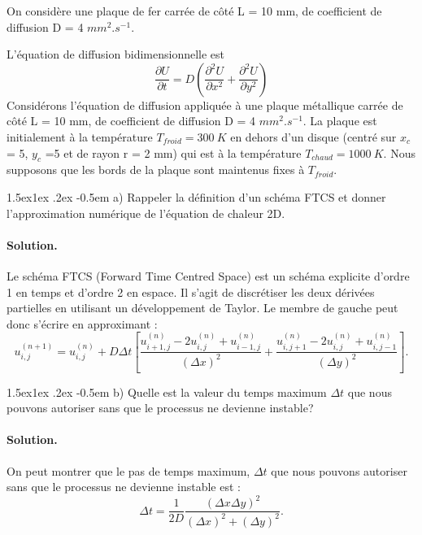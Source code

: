 \documentclass[%
oneside,                 %
final,                   %
10pt,french]{article}
\makeatletter
\newenvironment{doconceexercise}{}{}
\newcounter{doconceexercisecounter}
\newcommand\subex{\@startsection{paragraph}{4}{\z@}%
                  {1.5ex\@plus1ex \@minus.2ex}%
                  {-0.5em}%
                  {\normalfont\normalsize\bfseries}}
\makeatother
\begin{document}
\begin{doconceexercise}



On considère une plaque de fer carrée de côté L = 10 mm, de coefficient de diffusion D = 4 $mm^2.s^{-1}$.

L'équation de diffusion bidimensionnelle est
\begin{equation}
\frac{\partial U}{\partial t} = D\left(\frac{\partial^2U}{\partial x^2} + \frac{\partial^2U}{\partial y^2} \right)
\end{equation}
Considérons l'équation de diffusion appliquée à une plaque métallique carrée de côté L = 10 mm, de coefficient de diffusion D = 4 $mm^2.s^{-1}$. La plaque est initialement à la température $T_{froid} = 300 \ K$ en dehors d'un disque (centré sur $x_c$ = 5, $y_c$ =5 et de rayon r = 2 mm) qui est à la température $T_{chaud} = 1000 \ K$. Nous supposons que les bords de la plaque sont maintenus fixes à $T_{froid}$.


\subex{a)}
Rappeler la définition d'un schéma FTCS et donner l’approximation numérique de l'équation de chaleur 2D.


\paragraph{Solution.}
Le schéma FTCS (Forward Time Centred Space) est un schéma explicite d'ordre 1 en temps et d'ordre 2 en espace. Il s'agit de discrétiser les deux dérivées partielles en utilisant un développement de Taylor. Le membre de gauche peut donc s'écrire en approximant :
\begin{equation}
u_{i,j}^{(n+1)} = u_{i,j}^{(n)} + D\Delta t\left[ \frac{u_{i+1,j}^{(n)} - 2u_{i,j}^{(n)} + u_{i-1,j}^{(n)}}{(\Delta x)^2} + \frac{u_{i,j+1}^{(n)} - 2u_{i,j}^{(n)} + u_{i,j-1}^{(n)}}{(\Delta y)^2} \right].
\end{equation}


\subex{b)}
Quelle est la valeur du temps maximum $\Delta t$ que nous pouvons autoriser sans que le processus ne devienne instable?


\paragraph{Solution.}
On peut montrer que le pas de temps maximum, $\Delta t$ que nous pouvons autoriser sans que le processus ne devienne instable est :
\begin{equation}
\Delta t = \frac{1}{2D}\frac{(\Delta x\Delta y)^2}{(\Delta x)^2 + (\Delta y)^2}.
\end{equation}


\end{doconceexercise}
\end{document}
